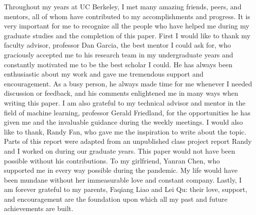 \documentclass[12pt]{article}
\numberwithin{figure}{section} %
\begin{document}
Throughout my years at UC Berkeley, I met many amazing friends, peers, and mentors, all of whom have contributed to my accomplishments and progress. It is very important for me to recognize all the people who have helped me during my graduate studies and the completion of this paper. First I would like to thank my faculty advisor, professor Dan Garcia, the best mentor I could ask for, who graciously accepted me to his research team in my undergraduate years and constantly motivated me to be the best scholar I could. He has always been enthusiastic about my work and gave me tremendous support and encouragement. As a busy person, he always made time for me whenever I needed discussion or feedback, and his comments enlightened me in many ways when writing this paper. I am also grateful to my technical advisor and mentor in the field of machine learning, professor Gerald Friedland, for the opportunities he has given me and the invaluable guidance during the weekly meetings. I would also like to thank, Randy Fan, who gave me the inspiration to write about the topic. Parts of this report were adapted from an unpublished class project report Randy and I worked on during our graduate years. This paper would not have been possible without his contributions. To my girlfriend, Yanran Chen, who supported me in every way possible during the pandemic. My life would have been mundane without her immeasurable love and constant company. Lastly, I am forever grateful to my parents, Faqiang Liao and Lei Qu: their love, support, and encouragement are the foundation upon which all my past and future achievements are built.     

\newpage
\listoffigures
\newpage
\listoftables
\newpage
\tableofcontents

\newpage
\end{document}
